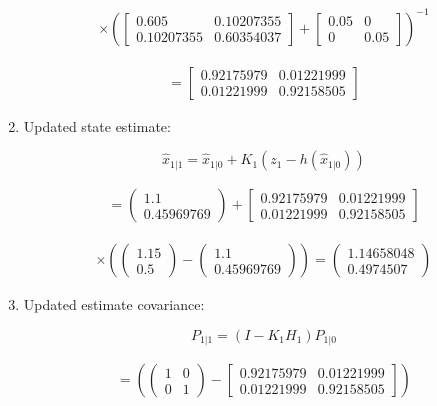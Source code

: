 \begin{enumerate}
  \[\begin{aligned}
  \times \left(  \begin{bmatrix} 0.605   &    0.10207355 \\
   0.10207355  &  0.60354037 \end{bmatrix}  + \begin{bmatrix} 0.05&0\\0& 0.05\end{bmatrix}\right)^{-1}
  \end{aligned}\]

  \[\begin{aligned}
  = \begin{bmatrix} 0.92175979 & 0.01221999 \\
          0.01221999 &  0.92158505 \end{bmatrix}
  \end{aligned}\]
\item
  Updated state estimate:

  \[\hat{x}_{1|1} =\hat{x}_{1|0} + K_1 \left(z_1 - h(\hat{x}_{1|0})\right)\]

  \[\begin{aligned}
  =\begin{pmatrix} 1.1 \\ 0.45969769\end{pmatrix} + \begin{bmatrix} 0.92175979 & 0.01221999 \\
          0.01221999 &  0.92158505 \end{bmatrix}
  \end{aligned}\]

  \[\begin{aligned}
  \times \left(\begin{pmatrix}1.15 \\ 0.5\end{pmatrix} -  \begin{pmatrix} 1.1 \\ 0.45969769 \end{pmatrix} \right)
    =  \begin{pmatrix} 1.14658048 \\ 0.4974507 \end{pmatrix}
  \end{aligned}\]
\item
  Updated estimate covariance:

  \[P_{1|1} =
    (I - K_1 H_1) P_{1|0}\]

  \[\begin{aligned}
  = \left( \begin{pmatrix}1&0\\0&1\end{pmatrix} -  \begin{bmatrix} 0.92175979 & 0.01221999 \\
          0.01221999 &  0.92158505 \end{bmatrix}\right)
  \end{aligned}\]


\end{enumerate}
